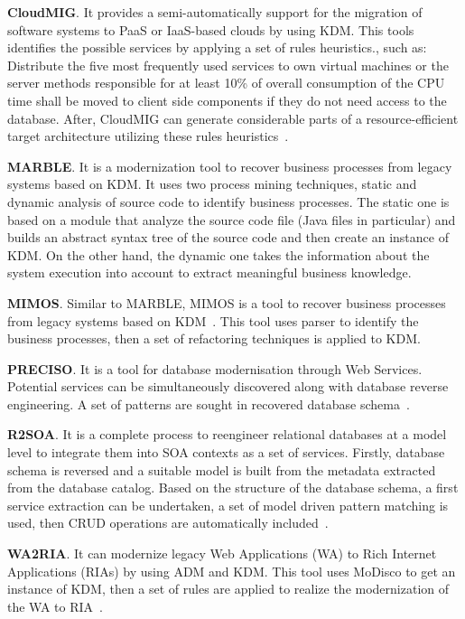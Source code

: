 \textbf{CloudMIG}. It provides a semi-automatically support for the migration of software systems to PaaS or IaaS-based clouds by using KDM. This tools identifies the possible services by applying a set of rules heuristics., such as: Distribute the five most frequently used services to own virtual machines or the server methods responsible for at least 10\% of overall consumption of the CPU time shall be moved to client side components if they do not need access to the database. After, CloudMIG can generate considerable parts of a resource-efficient target architecture utilizing these rules heuristics~\cite{SMR:SMR582}. 


\textbf{MARBLE}. It is a modernization tool to recover business processes from legacy systems based on KDM. It uses two process mining techniques, static and dynamic analysis of source code to identify business processes. The static one is based on a module that analyze the source code file (Java files in particular) and builds an abstract syntax tree of the source code and then create an instance of KDM. On the other hand, the dynamic one takes the information about the system execution into account to extract meaningful business knowledge.

\textbf{MIMOS}. Similar to MARBLE, MIMOS is a tool to recover business processes from legacy systems based on KDM~\cite{6498507}. This tool uses parser to identify the business processes, then a set of refactoring techniques is applied to KDM.

\textbf{PRECISO}. It is a tool for database modernisation through Web Services. Potential services can be simultaneously discovered along with database reverse engineering. A set of patterns are sought in recovered database schema~\cite{delCastillo:2009:PRP:1529282.1529753}.

\textbf{R2SOA}. It is a complete process to reengineer relational databases at a model level to integrate them into SOA contexts as a set of services. Firstly, database schema is reversed and a suitable model is built from the metadata extracted from the database catalog. Based on the structure of the database schema, a first service extraction can be undertaken, a set of model driven pattern matching is used, then CRUD operations are automatically included~\cite{Guzman:2007:AAR:1339262.1339532}.

\textbf{WA2RIA}. It can modernize legacy Web Applications (WA) to Rich Internet Applications (RIAs) by using ADM and KDM. This tool uses MoDisco to get an instance of KDM, then a set of rules are applied to realize the modernization of the WA to RIA~\cite{Rodriguez-Echeverria:2011:MLW:2186508.2186536}.

